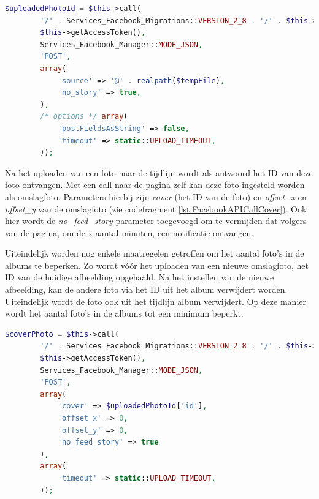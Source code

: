 \begin{lstlisting}[caption={Uploaden van een foto naar Facebook},label=lst:FacebookAPICallUpload,language=PHP]
	$uploadedPhotoId = $this->call(
		'/' . Services_Facebook_Migrations::VERSION_2_8 . '/' . $this->getServiceId() . '/photos',
		$this->getAccessToken(),
		Services_Facebook_Manager::MODE_JSON,
		'POST',
		array(
			'source' => '@' . realpath($tempFile),
			'no_story' => true,
		),
		/* options */ array( 
			'postFieldsAsString' => false,
			'timeout' => static::UPLOAD_TIMEOUT,
		));
\end{lstlisting}


Na het uploaden van een foto naar de tijdlijn wordt als antwoord het ID van deze foto ontvangen. Met een call naar de pagina zelf kan deze foto ingesteld worden als omslagfoto. Parameters hierbij zijn \textit{cover} (het ID van de foto) en \textit{offset{\_}x} en \textit{offset{\_}y} van de omslagfoto (zie codefragment \ref{lst:FacebookAPICallCover}). Ook hier wordt de \textit{no{\_}feed{\_}story} parameter toegevoegd om te vermijden dat volgers van de pagina, om de x aantal minuten, een notificatie ontvangen. 

Uiteindelijk worden nog enkele maatregelen getroffen om het aantal foto's in de albums te beperken. Zo wordt v\'{o}\'{o}r het uploaden van een nieuwe omslagfoto, het ID van de huidige afbeelding opgehaald. Na het instellen van de nieuwe afbeelding, kan de andere foto via het ID uit het album verwijdert worden. Uiteindelijk wordt de foto ook uit het tijdlijn album verwijdert. Op deze manier wordt het aantal foto's in de albums tot een minimum beperkt.

\begin{lstlisting}[caption={Instellen van omslagfoto op Facebook},label=lst:FacebookAPICallCover,language=PHP]
	$coverPhoto = $this->call(
		'/' . Services_Facebook_Migrations::VERSION_2_8 . '/' . $this->getServiceId(),
		$this->getAccessToken(),
		Services_Facebook_Manager::MODE_JSON,
		'POST',
		array(
			'cover' => $uploadedPhotoId['id'],
			'offset_x' => 0,
			'offset_y' => 0,
			'no_feed_story' => true
		),
		array(
			'timeout' => static::UPLOAD_TIMEOUT,
		));
\end{lstlisting}

